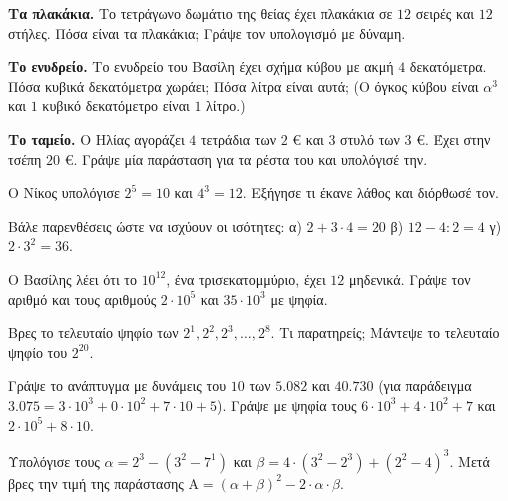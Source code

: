 \ex \textbf{Τα πλακάκια.} Το τετράγωνο δωμάτιο της θείας έχει πλακάκια σε $12$ σειρές και $12$ στήλες. Πόσα είναι τα πλακάκια; Γράψε τον υπολογισμό με δύναμη.

\ex \textbf{Το ενυδρείο.} Το ενυδρείο του Βασίλη έχει σχήμα κύβου με ακμή $4$ δεκατόμετρα. Πόσα κυβικά δεκατόμετρα χωράει; Πόσα λίτρα είναι αυτά; (Ο όγκος κύβου είναι $\alpha^3$ και $1$ κυβικό δεκατόμετρο είναι $1$ λίτρο.)

\ex \textbf{Το ταμείο.} Ο Ηλίας αγοράζει $4$ τετράδια των $2$ € και $3$ στυλό των $3$ €. Έχει στην τσέπη $20$ €. Γράψε μία παράσταση για τα ρέστα του και υπολόγισέ την.


\ex Ο Νίκος υπολόγισε $2^5=10$ και $4^3=12$. Εξήγησε τι έκανε λάθος και διόρθωσέ τον.

\ex Βάλε παρενθέσεις ώστε να ισχύουν οι ισότητες: α) $2+3\cdot 4=20$ \quad β) $12-4:2=4$ \quad γ) $2\cdot 3^2=36$.

\ex Ο Βασίλης λέει ότι το $10^{12}$, ένα τρισεκατομμύριο, έχει $12$ μηδενικά. Γράψε τον αριθμό και τους αριθμούς $2\cdot 10^5$ και $35\cdot 10^3$ με ψηφία.

\ex Βρες το τελευταίο ψηφίο των $2^1,2^2,2^3,\dots,2^8$. Τι παρατηρείς; Μάντεψε το τελευταίο ψηφίο του $2^{20}$.


\ex Γράψε το ανάπτυγμα με δυνάμεις του $10$ των $5.082$ και $40.730$ (για παράδειγμα $3.075=3\cdot 10^3+0\cdot 10^2+7\cdot 10+5$). Γράψε με ψηφία τους $6\cdot 10^3+4\cdot 10^2+7$ και $2\cdot 10^5+8\cdot 10$.

\ex Υπολόγισε τους $\alpha=2^3-(3^2-7^1)$ και $\beta=4\cdot(3^2-2^3)+(2^2-4)^3$. Μετά βρες την τιμή της παράστασης $\mathrm{Α}=(\alpha+\beta)^2-2\cdot\alpha\cdot\beta$.
